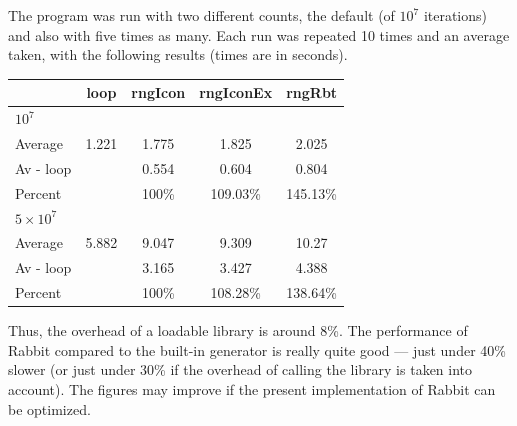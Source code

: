 \documentclass[letterpaper,12pt]{article}
\begin{document}
The program was run with two different counts, the default (of $10^7$
iterations) and also with five times as many. Each run was repeated 10
times and an average taken, with the following results (times are in seconds).

\begin{center}
\begin{tabular}{|lcccc|}
  \hline
  & {\sf loop} & {\sf rngIcon} & {\sf rngIconEx} & {\sf rngRbt}\\
  \hline
$10^7$ &&&&\\
  Average & 1.221 &	1.775 &	1.825 &	2.025\\
  Av - loop & & 0.554 &	0.604 &	0.804\\
  Percent & & 100\% &	109.03\% &	145.13\% \\
\hline
$5\times 10^7$&&&&\\
  Average & 5.882 &	9.047 &	9.309 &	10.27\\
  Av - loop & & 3.165 &	3.427 &	4.388\\
  Percent & & 100\% &	108.28\% &	138.64\%\\
\hline
\end{tabular}
\end{center}

Thus, the overhead of a loadable library is around 8\%. The performance of
Rabbit compared to the built-in generator is really quite good --- just
under 40\% slower (or just under 30\% if the overhead of calling the
library is taken into account). The figures may improve if the present
implementation of Rabbit can be optimized.
\end{document}
